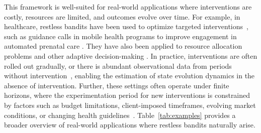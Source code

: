 This framework is well-suited for real-world applications where interventions are costly, resources are limited, and outcomes evolve over time.
For example, in healthcare, restless bandits have been used to optimize targeted interventions~\citep{villar2015multi,biswas2021learn}, such as guidance calls in mobile health programs to improve engagement in automated prenatal care \citep{mate2021}.
They have also been applied to resource allocation problems \citep{borkar2017opportunistic} and other 
adaptive decision-making \citep{brown2020index}.  In practice, interventions are often rolled out gradually, or there is abundant observational data from periods without intervention~\citep{Liu2014, Shaikh2019, mate2021,perianez2024reform},
enabling the estimation of
state evolution dynamics in the absence of intervention.
Further, these settings often operate under finite horizons, where the experimentation period for new interventions is constrained by factors such as budget limitations, client-imposed timeframes, evolving market conditions, or changing health guidelines~\citep{delrío2024, delrío2024Pharmacy}.
Table~\ref{tab:examples} provides a broader overview of real-world applications where restless bandits naturally arise.
